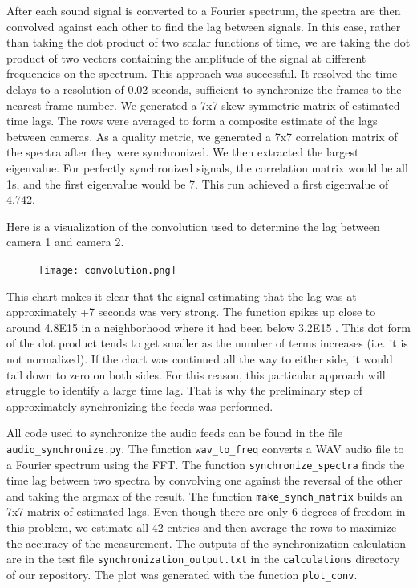 \documentclass{article}
\begin{document}
After each sound signal is converted to a Fourier spectrum, 
the spectra are then convolved against each other to find the lag between signals.
In this case, rather than taking the dot product of two scalar functions of time, 
we are taking the dot product of two vectors containing the amplitude of the 
signal at different frequencies on the spectrum.  
This approach was successful.  It resolved the time delays to a resolution of 0.02 seconds,
sufficient to synchronize the frames to the nearest frame number.
We generated a 7x7 skew symmetric matrix of estimated time lags.
The rows were averaged to form a composite estimate of the lags between cameras.
As a quality metric, we generated a 7x7 correlation matrix of the spectra after
they were synchronized.  We then extracted the largest eigenvalue.
For perfectly synchronized signals, the correlation matrix would be all 1s,
and the first eigenvalue would be 7.  This run achieved a first eigenvalue of 4.742.

Here is a visualization of the convolution used to determine the lag between camera 1 and camera 2.
\begin{figure}[H]
\center
\texttt{[image: convolution.png]}
\end{figure}

This chart makes it clear that the signal estimating that the lag was at approximately 
+7 seconds was very strong.  The function spikes up close to around 4.8E15 in a 
neighborhood where it had been below 3.2E15 .  
This dot form of the dot product tends to get smaller as the number of terms increases
(i.e. it is not normalized).  
If the chart was continued all the way to either side, it would tail down to zero 
on both sides.  For this reason, this particular approach will struggle to identify a large time lag.
That is why the preliminary step of approximately synchronizing the feeds was performed.

All code used to synchronize the audio feeds can be found in the file \texttt{audio\_synchronize.py}.
The function \texttt{wav\_to\_freq} converts a WAV audio file to a Fourier spectrum using the FFT.
The function \texttt{synchronize\_spectra} finds the time lag between two spectra by convolving one
against the reversal of the other and taking the argmax of the result.
The function \texttt{make\_synch\_matrix} builds an 7x7 matrix of estimated lags.
Even though there are only 6 degrees of freedom in this problem, 
we estimate all 42 entries and then average the rows to maximize the accuracy of the measurement.
The outputs of the synchronization calculation are in the test file \texttt{synchronization\_output.txt}
in the \texttt{calculations} directory of our repository.
The plot was generated with the function \texttt{plot\_conv}.
\end{document}
